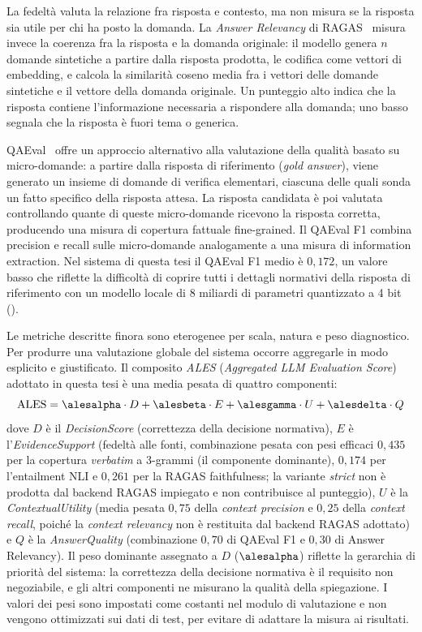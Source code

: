 La fedeltà valuta la relazione fra risposta e contesto, ma non misura se
la risposta sia utile per chi ha posto la domanda. La \emph{Answer Relevancy}
di RAGAS~\cite{ragas2024} misura invece la coerenza fra la risposta e la
domanda originale: il modello genera $n$ domande sintetiche a partire dalla
risposta prodotta, le codifica come vettori di embedding, e calcola la
similarità coseno media fra i vettori delle domande sintetiche e il vettore
della domanda originale. Un punteggio alto indica che la risposta contiene
l'informazione necessaria a rispondere alla domanda; uno basso segnala
che la risposta è fuori tema o generica.

QAEval~\cite{deutsch2021qaeval} offre un approccio alternativo alla valutazione
della qualità basato su micro-domande: a partire dalla risposta di
riferimento (\emph{gold answer}), viene generato un insieme di domande
di verifica elementari, ciascuna delle quali sonda un fatto specifico
della risposta attesa. La risposta candidata è poi valutata controllando
quante di queste micro-domande ricevono la risposta corretta, producendo
una misura di copertura fattuale fine-grained. Il QAEval F1 combina
precision e recall sulle micro-domande analogamente a una misura di
information extraction. Nel sistema di questa tesi il QAEval F1 medio
è $0{,}172$, un valore basso che riflette la difficoltà di coprire
tutti i dettagli normativi della risposta di riferimento con un modello locale di
8 miliardi di parametri quantizzato a 4 bit (\llmmodel).

Le metriche descritte finora sono eterogenee per scala, natura e peso
diagnostico. Per produrre una valutazione globale del sistema occorre
aggregarle in modo esplicito e giustificato. Il composito \emph{ALES}
(\emph{Aggregated LLM Evaluation Score}) adottato in questa tesi è una
media pesata di quattro componenti:
\[
  \text{ALES} = \alesalpha \cdot D + \alesbeta \cdot E + \alesgamma \cdot U + \alesdelta \cdot Q
\]
dove $D$ è il \emph{DecisionScore} (correttezza della decisione normativa),
$E$ è l'\emph{EvidenceSupport} (fedeltà alle fonti, combinazione pesata con pesi
efficaci $0{,}435$ per la copertura \emph{verbatim} a 3-grammi (il componente
dominante), $0{,}174$ per l'entailment NLI e $0{,}261$ per la RAGAS
faithfulness; la variante \emph{strict} non è prodotta dal backend RAGAS
impiegato e non contribuisce al punteggio), $U$ è la \emph{ContextualUtility}
(media pesata $0{,}75$ della \emph{context precision} e $0{,}25$ della
\emph{context recall}, poiché la \emph{context relevancy} non è restituita dal
backend RAGAS adottato) e $Q$ è la \emph{AnswerQuality} (combinazione $0{,}70$ di
QAEval F1 e $0{,}30$ di Answer Relevancy). Il peso dominante assegnato a $D$ ($\alesalpha$) riflette
la gerarchia di priorità del sistema: la correttezza della decisione normativa
è il requisito non negoziabile, e gli altri componenti ne misurano la
qualità della spiegazione. I valori dei pesi sono impostati come costanti nel
modulo di valutazione e non vengono ottimizzati sui dati di test, per evitare
di adattare la misura ai risultati.

